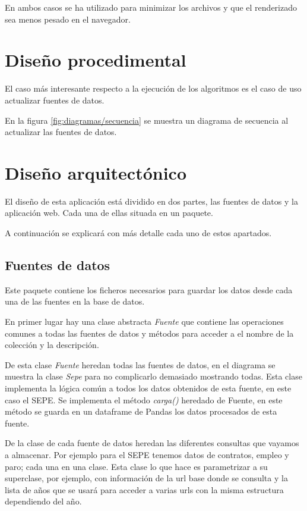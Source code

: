 En ambos casos se ha utilizado  \cite{misc:mapshaper} para minimizar los archivos y que el renderizado sea menos pesado en el navegador.

\section{Diseño procedimental}

El caso más interesante respecto a la ejecución de los algoritmos es el caso de uso actualizar fuentes de datos.

En la figura \ref{fig:diagramas/secuencia} se muestra un diagrama de secuencia al actualizar las fuentes de datos.


\section{Diseño arquitectónico}

El diseño de esta aplicación está dividido en dos partes, las fuentes de datos y la aplicación web. Cada una de ellas situada en un paquete.

A continuación se explicará con más detalle cada uno de estos apartados.

\subsection{Fuentes de datos}

Este paquete contiene los ficheros necesarios para guardar los datos desde cada una de las fuentes en la base de datos.

En primer lugar hay una clase abstracta \textit{Fuente} que contiene las operaciones comunes a todas las fuentes de datos y métodos para acceder a el nombre de la colección y la descripción.

De esta clase \textit{Fuente} heredan todas las fuentes de datos, en el diagrama se muestra la clase \textit{Sepe} para no complicarlo demasiado mostrando todas. Esta clase implementa la lógica común a todos los datos obtenidos de esta fuente, en este caso el SEPE. Se implementa el método \textit{carga()} heredado de Fuente, en este método se guarda en un dataframe de Pandas los datos procesados de esta fuente.

De la clase de cada fuente de datos heredan las diferentes consultas que vayamos a almacenar. Por ejemplo para el SEPE tenemos datos de contratos, empleo y paro; cada una en una clase. Esta clase lo que hace es parametrizar a su superclase, por ejemplo, con información de la url base donde se consulta y la lista de años que se usará para acceder a varias urls con la misma estructura dependiendo del año.

